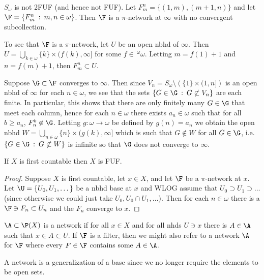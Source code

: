 \documentclass{article}
\begin{document}
\begin{exam}
    \(S_{\omega}\) is not 2FUF (and hence not FUF). Let \(F_m^n = \{(1, m), (m + 1, n)\}\) and let \(\F = \{F_m^n \: : \: m,n \in \omega\}\). Then \(\F\) is a \(\pi\)-network at \(\infty\) with no convergent subcollection. 
    
    To see that \(\F\) is a \(\pi\)-network, let \(U\) be an open nbhd of \(\infty\). Then \(U = \bigcup_{k \in \omega} \{k\} \times (f(k), \infty]\) for some \(f \in \, ^{\omega}\omega\). Letting \(m = f(1) + 1\) and \(n = f(m) + 1\), then \(F_m^n \subset U\).

    Suppose \(\G \subset \F\) converges to \(\infty\). Then since \(V_n = S_{\omega}\setminus \left(\{1\} \times (1, n]\right)\) is an open nbhd of \(\infty\) for each \(n \in \omega\), we see that the sets \(\{G \in \G \: : \: G \not \subset V_n\}\) are each finite. In particular, this shows that there are only finitely many \(G \in \G\) that meet each column, hence for each \(n \in \omega\) there exists \(a_n \in \omega\) such that for all \(b \geq a_n\), \(F_n^b \not \in \G\). Letting \(g:\omega \to \omega\) be defined by \(g(n) = a_n\) we obtain the open nbhd \(W = \bigcup_{n \in \omega} \{n\} \times (g(k), \infty]\) which is such that \(G \not \in W\) for all \(G \in \G\), i.e. \(\{G \in \G \: : \: G \not \subset W\}\) is infinite so that \(\G\) does not converge to \(\infty\).
\end{exam}
\begin{prop}
    If \(X\) is first countable then \(X\) is FUF.
\end{prop}
\begin{proof}
    Suppose \(X\) is first countable, let \(x \in X\), and let \(\F\) be a \(\pi\)-network at \(x\). Let \(\U = \{U_0, U_1, \dots\}\) be a nbhd base at \(x\) and WLOG assume  that \(U_0 \supset U_1 \supset \dots\) (since otherwise we could just take \(U_0, U_0\cap U_1, \dots\)). Then for each \(n \in \omega\) there is a \(\F \ni F_n \subset U_n\) and the \(F_n\) converge to \(x\).
\end{proof}
\begin{defn}
    \(\A \subset \P(X)\) is a network if for all \(x \in X\) and for all nhds \(U \ni x\) there is \(A \in \A\) such that \(x \in A \subset U\). If \(\F\) is a filter, then we might also refer to a network \(\A\) for \(\F\) where every \(F \in \F\) contains some \(A \in \A\).
\end{defn}
\begin{rem}
    A network is a generalization of a base since we no longer require the elements to be open sets.
\end{rem}
\end{document}

